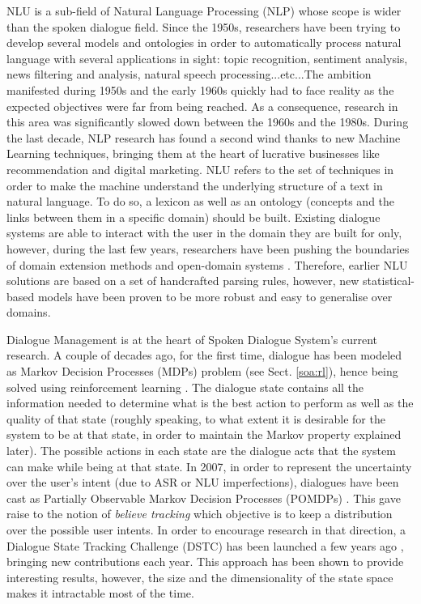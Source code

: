 		NLU is a sub-field of Natural Language Processing (NLP) whose scope is wider than the spoken dialogue field. Since the 1950s, researchers have been trying to develop several models and ontologies in order to automatically process natural language with several applications in sight: topic recognition, sentiment analysis, news filtering and analysis, natural speech processing...etc...The ambition manifested during 1950s and the early 1960s quickly had to face reality as the expected objectives were far from being reached. As a consequence, research in this area was significantly slowed down between the 1960s and the 1980s. During the last decade, NLP research has found a second wind thanks to new Machine Learning techniques, bringing them at the heart of lucrative businesses like recommendation and digital marketing. NLU refers to the set of techniques in order to make the machine understand the underlying structure of a text in natural language. To do so, a lexicon as well as an ontology (concepts and the links between them in a specific domain) should be built. Existing dialogue systems are able to interact with the user in the domain they are built for only, however, during the last few years, researchers have been pushing the boundaries of domain  extension methods \cite{Gasic2013} and open-domain systems \cite{Pakucs2003,EkeinhorKomi2014,Wang2014}. Therefore, earlier NLU solutions are based on a set of handcrafted parsing rules, however, new statistical-based models \cite{Macherey2009} have been proven to be more robust and easy to generalise over domains.

		Dialogue Management is at the heart of Spoken Dialogue System's current research. A couple of decades ago, for the first time, dialogue has been modeled as Markov Decision Processes (MDPs) problem (see Sect. \ref{soa:rl}), hence being solved using reinforcement learning \cite{Eckert1997}. The dialogue state contains all the information needed to determine what is the best action to perform as well as the quality of that state (roughly speaking, to what extent it is desirable for the system to be at that state, in order to maintain the Markov property explained later). The possible actions in each state are the dialogue acts that the system can make while being at that state. In 2007, in order to represent the uncertainty over the user's intent (due to ASR or NLU imperfections), dialogues have been cast as Partially Observable Markov Decision Processes (POMDPs) \cite{Williams2007}. This gave raise to the notion of \textit{believe tracking} which objective is to keep a distribution over the possible user intents. In order to encourage research in that direction, a Dialogue State Tracking Challenge (DSTC) has been launched a few years ago \cite{Williams2012b}, bringing new contributions each year. This approach has been shown to provide interesting results, however, the size and the dimensionality of the state space makes it intractable most of the time.
		

